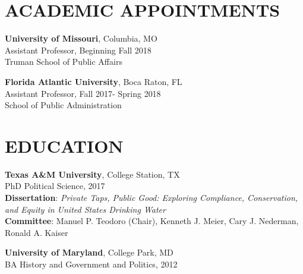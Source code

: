 \documentclass[margin]{res} %
\begin{document}
\begin{resume}




\section{ACADEMIC APPOINTMENTS}
\begin{hangparas}{.25in}{1}\textbf{University of Missouri}, Columbia, MO \\
Assistant Professor,  Beginning Fall 2018 \\
Truman School of Public Affairs

\textbf{Florida Atlantic University}, Boca Raton, FL \\
Assistant Professor,  Fall 2017- Spring 2018 \\
School of Public Administration  \end{hangparas}


\section{EDUCATION}
\begin{hangparas}{.25in}{1}\textbf{Texas A\&M University}, College Station, TX \\
PhD Political Science,  2017 \\
\textbf{Dissertation}: \textit{Private Taps, Public Good: Exploring Compliance, Conservation, and Equity in United States Drinking Water} \\
\textbf{Committee}: Manuel P. Teodoro (Chair), Kenneth J. Meier, Cary J. Nederman, Ronald A. Kaiser

\textbf{University of Maryland}, College Park, MD \\
 BA History and Government and Politics, 2012 \end{hangparas}





\end{resume}
\end{document}
